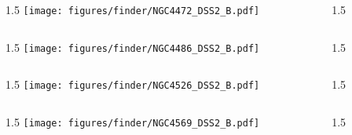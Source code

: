 \documentclass[final]{beamer}
\newlength{\colwidth}
\begin{document}

\begin{frame}[t]{}
  \begin{columns}[T]
    \begin{column}{1.5\colwidth}
      \centering
      \texttt{[image: figures/finder/NGC4472\_DSS2\_B.pdf]}
    \end{column}
    \begin{column}{1.5\colwidth}
      \Large
      
    \end{column}
  \end{columns}
  \vspace{\fill}
  \begin{columns}[T]
    \begin{column}{1.5\colwidth}
      \centering
      \texttt{[image: figures/finder/NGC4486\_DSS2\_B.pdf]}
    \end{column}
    \begin{column}{1.5\colwidth}
      \Large
      
    \end{column}
  \end{columns}
\end{frame}


\begin{frame}[t]{}
  \begin{columns}[T]
    \begin{column}{1.5\colwidth}
      \centering
      \texttt{[image: figures/finder/NGC4526\_DSS2\_B.pdf]}
    \end{column}
    \begin{column}{1.5\colwidth}
      \Large
      
    \end{column}
  \end{columns}
  \vspace{\fill}
  \begin{columns}[T]
    \begin{column}{1.5\colwidth}
      \centering
      \texttt{[image: figures/finder/NGC4569\_DSS2\_B.pdf]}
    \end{column}
    \begin{column}{1.5\colwidth}
      \Large
      
    \end{column}
  \end{columns}
\end{frame}
\end{document}

